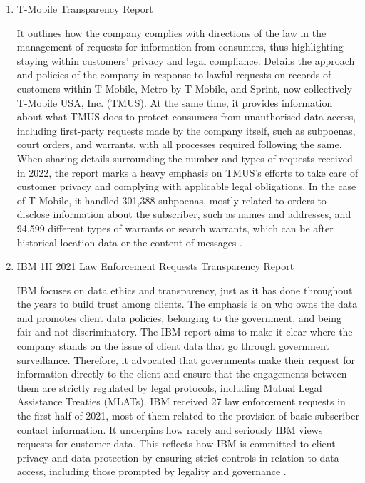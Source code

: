 \begin{enumerate}
\item  T-Mobile Transparency Report

It outlines how the company complies with directions of the law in the management of requests for information from consumers, thus highlighting staying within customers' privacy and legal compliance. Details the approach and policies of the company in response to lawful requests on records of customers within T-Mobile, Metro by T-Mobile, and Sprint, now collectively T-Mobile USA, Inc. (TMUS). At the same time, it provides information about what TMUS does to protect consumers from unauthorised data access, including first-party requests made by the company itself, such as subpoenas, court orders, and warrants, with all processes required following the same. When sharing details surrounding the number and types of requests received in 2022, the report marks a heavy emphasis on TMUS’s efforts to take care of customer privacy and complying with applicable legal obligations. In the case of T-Mobile, it handled 301,388 subpoenas, mostly related to orders to disclose information about the subscriber, such as names and addresses, and 94,599 different types of warrants or search warrants, which can be after historical location data or the content of messages \cite{TMobile2022TransparencyReport}.

\item IBM 1H 2021 Law Enforcement Requests Transparency Report
 
 IBM focuses on data ethics and transparency, just as it has done throughout the years to build trust among clients. The emphasis is on who owns the data and promotes client data policies, belonging to the government, and being fair and not discriminatory. The IBM report aims to make it clear where the company stands on the issue of client data that go through government surveillance. Therefore, it advocated that governments make their request for information directly to the client and ensure that the engagements between them are strictly regulated by legal protocols, including Mutual Legal Assistance Treaties (MLATs). IBM received 27 law enforcement requests in the first half of 2021, most of them related to the provision of basic subscriber contact information. It underpins how rarely and seriously IBM views requests for customer data. This reflects how IBM is committed to client privacy and data protection by ensuring strict controls in relation to data access, including those prompted by legality and governance \cite{IBMTransparencyReport2023}.


\end{enumerate}
